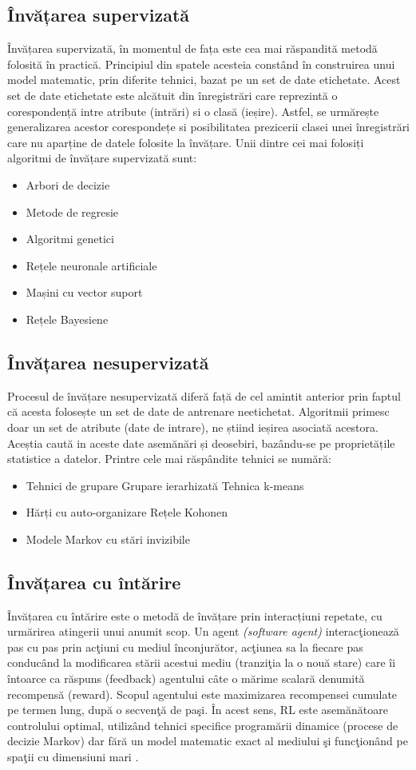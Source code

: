 \subsection{Învățarea supervizată}
Învățarea supervizată, în momentul de fața este cea mai răspandită metodă folosită în practică. Principiul din spatele acesteia constând în construirea unui model matematic, prin diferite tehnici, bazat pe un set de date etichetate. Acest set de date etichetate este alcătuit din înregistrări care reprezintă o corespondență intre atribute (intrări) si o clasă (ieșire). Astfel, se urmărește generalizarea acestor corespondețe si posibilitatea prezicerii clasei unei înregistrări care nu aparține de datele folosite la învățare. Unii dintre cei mai folosiți algoritmi de învățare supervizată sunt:
\begin{itemize}
	\item Arbori de decizie
	\item Metode de regresie
	\item Algoritmi genetici
	\item Rețele neuronale artificiale
	\item Mașini cu vector suport
	\item Rețele Bayesiene
\end{itemize}

\subsection{Învățarea nesupervizată}
Procesul de învățare nesupervizată diferă față de cel amintit anterior prin faptul că acesta folosește un set de date de antrenare neetichetat. Algoritmii primesc doar un set de atribute (date de intrare), ne știind ieșirea asociată acestora. Aceștia caută in aceste date asemănări și deosebiri, bazându-se pe proprietățile statistice a datelor. Printre cele mai răspândite tehnici se numără:
\begin{itemize}
	\item Tehnici de grupare
	\subitem Grupare ierarhizată
	\subitem Tehnica k-means
	\item Hărți cu auto-organizare
	\subitem Rețele Kohonen
	\item Modele Markov cu stări invizibile
\end{itemize}

\subsection{Învățarea cu întărire}
Învățarea cu întărire este o metodă de învățare prin interacțiuni repetate, cu urmărirea atingerii unui anumit scop. Un agent \textit{(software agent)} interacţionează pas cu pas prin acţiuni cu mediul înconjurător, acţiunea sa la fiecare pas conducând la modificarea stării acestui mediu (tranziţia la o nouă stare) care îi întoarce ca răspuns (feedback) agentului câte o mărime scalară denumită recompensă (reward). Scopul agentului este maximizarea recompensei cumulate pe termen lung, după o secvenţă de paşi. În acest sens, RL este asemănătoare controlului optimal, utilizând tehnici specifice programării dinamice (procese de decizie Markov) dar fără un model matematic exact al mediului şi funcţionând pe spaţii cu dimensiuni mari \cite{Vrejdoiu:2019}.

